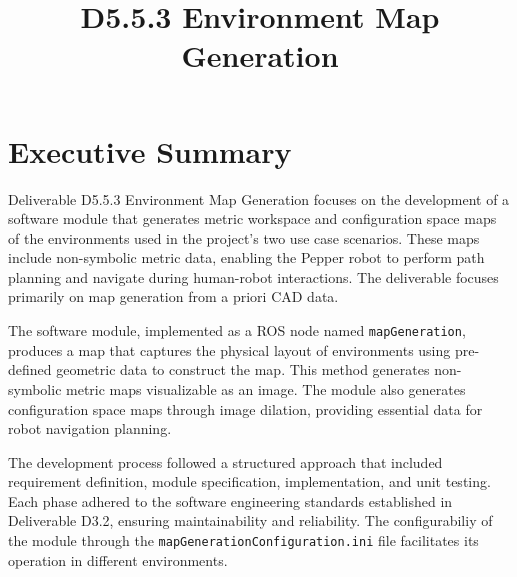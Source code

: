 \documentclass{CSSRforAfrica}
\begin{document}



\title{D5.5.3 Environment Map Generation}        %




\maketitle

\section*{Executive Summary}
\label{executive_summary}

Deliverable D5.5.3 Environment Map Generation focuses on the development of a software module that generates metric workspace and configuration space maps of the environments used in the project's two use case scenarios. These maps include non-symbolic metric data, enabling the Pepper robot to perform path planning and navigate during human-robot interactions. The deliverable focuses primarily on map generation from a priori CAD data.

\noindent The software module, implemented as a ROS node named \texttt{mapGeneration}, produces a map that captures the physical layout of environments using pre-defined geometric data to construct the map. This method generates non-symbolic metric maps visualizable as an image. The module also generates configuration space maps through image dilation, providing essential data for robot navigation planning.

\noindent The development process followed a structured approach that included requirement definition, module specification, implementation, and unit testing. Each phase adhered to the software engineering standards established in Deliverable D3.2, ensuring maintainability and reliability. The configurabiliy of the module through the \texttt{mapGenerationConfiguration.ini} file facilitates its operation in different environments.
\end{document}
